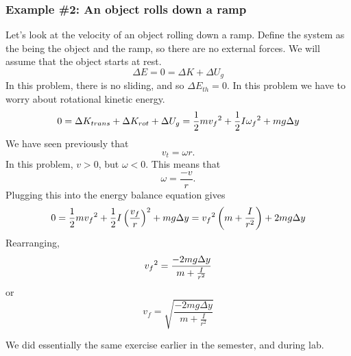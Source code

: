 \subsubsection{Example \#2: An object rolls down a ramp}
Let's look at the velocity of an object rolling down a ramp. Define the system as the being the object and the ramp, so there are no external forces. We will assume that the object starts at rest.
$$\Delta{E}=0=\Delta{K}+\Delta{U_g}$$
In this problem, there is no sliding, and so $\Delta{E_{th}}=0$. In this problem we have to worry about rotational kinetic energy.
$$0=\Delta{K_{trans}}+\Delta{K_{rot}}+\Delta{U_g}=\frac{1}{2}mv_f\displaystyle^2+\frac{1}{2}I\omega_f\displaystyle^2+mg\Delta y$$
We have seen previously that 
$$v_t=\omega r.$$
In this problem, $v>0$, but $\omega<0$. This means that 
$$\omega=\frac{-v}{r}.$$
Plugging this into the energy balance equation gives
$$0=\frac{1}{2}mv_f\displaystyle^2+\frac{1}{2}I\left(\frac{v_f}{r}\right)^2+mg\Delta y=v_f\displaystyle^2\left(m+\frac{I}{r^2}\right)+2mg\Delta{y}$$
Rearranging,
$$v_f\displaystyle^2=\frac{-2mg\Delta{y}}{m+\frac{I}{r^2}}$$
or
$$\boxed{v_f=\sqrt{\frac{-2mg\Delta{y}}{m+\frac{I}{r^2}}}}$$

We did essentially the same exercise earlier in the semester, and during lab. 

\clearpage
